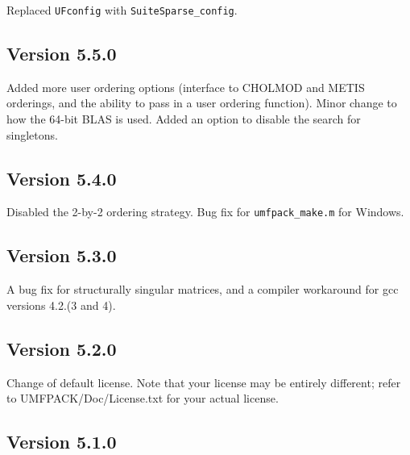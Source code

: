 \documentclass[11pt]{article}
\begin{document}
Replaced {\tt UFconfig} with {\tt SuiteSparse\_config}.

\subsection{Version 5.5.0}

Added more user ordering options (interface to CHOLMOD and METIS orderings,
and the ability to pass in a user ordering function).
Minor change to how the 64-bit BLAS is used.
Added an option to disable the search for singletons.

\subsection{Version 5.4.0}

Disabled the 2-by-2 ordering strategy.
Bug fix for \verb'umfpack_make.m' for Windows.

\subsection{Version 5.3.0}

A bug fix for structurally singular matrices, and a compiler workaround for
gcc versions 4.2.(3 and 4).

\subsection{Version 5.2.0}

Change of default license.
Note that your license may be entirely different;
refer to UMFPACK/Doc/License.txt for your actual license.

\subsection{Version 5.1.0}
\end{document}

